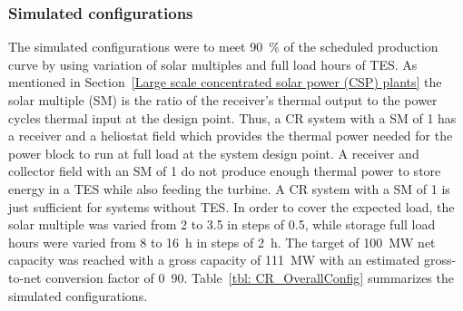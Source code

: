 \subsubsection{Simulated configurations}
The simulated configurations were to meet 90~\% of the scheduled production curve by using variation of solar multiples and full load hours of TES. As mentioned in Section~\ref{Large scale concentrated solar power (CSP) plants} the solar multiple (SM) is the ratio of the receiver's thermal output to the power cycles thermal input at the design point. Thus, a CR system with a SM of 1 has a receiver and a heliostat field which provides the thermal power needed for the power block to run at full load at the system design point. A receiver and collector field with an SM of 1 do not produce enough thermal power to store energy in a TES while also feeding the turbine. A CR system with a SM of 1 is just sufficient for systems without TES. In order to cover the expected load, the solar multiple was varied from 2 to 3.5 in steps of 0.5, while storage full load hours were varied from 8 to \SI{16}{h} in steps of \SI{2}{h}. The target of \SI{100}{MW} net capacity was reached with a gross capacity of \SI{111}{MW} with an estimated gross-to-net conversion factor of \si{0.90}. Table~\ref{tbl: CR_OverallConfig} summarizes the simulated configurations.


